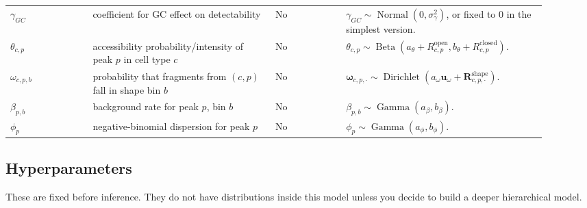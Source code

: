 \documentclass[11pt]{article}
\newcommand{\Dir}{\operatorname{Dirichlet}}
\newcommand{\Gam}{\operatorname{Gamma}}
\newcommand{\Betadist}{\operatorname{Beta}}
\newcommand{\Normal}{\operatorname{Normal}}
\begin{document}
\begin{longtable}{L{0.14\linewidth}L{0.31\linewidth}C{0.12\linewidth}L{0.34\linewidth}}
\(\gamma_{GC}\) & coefficient for GC effect on detectability & No & \(\gamma_{GC}\sim\Normal(0,\sigma_{\gamma}^{2})\), or fixed to 0 in the simplest version. \\
\(\theta_{c,p}\) & accessibility probability/intensity of peak \(p\) in cell type \(c\) & No & \(\theta_{c,p}\sim\Betadist(a_{\theta}+R_{c,p}^{\mathrm{open}},b_{\theta}+R_{c,p}^{\mathrm{closed}})\). \\
\(\omega_{c,p,b}\) & probability that fragments from \((c,p)\) fall in shape bin \(b\) & No & \(\boldsymbol{\omega}_{c,p,\cdot}\sim\Dir(a_{\omega}\boldsymbol{u}_{\omega}+\boldsymbol{R}^{\mathrm{shape}}_{c,p,\cdot})\). \\
\(\beta_{p,b}\) & background rate for peak \(p\), bin \(b\) & No & \(\beta_{p,b}\sim\Gam(a_{\beta},b_{\beta})\). \\
\(\phi_p\) & negative-binomial dispersion for peak \(p\) & No & \(\phi_p\sim\Gam(a_{\phi},b_{\phi})\). \\
\bottomrule
\end{longtable}

\subsection{Hyperparameters}

These are fixed before inference.  They do not have distributions inside this model unless you decide to build a deeper hierarchical model.
\end{document}
